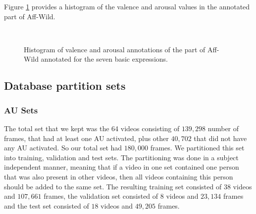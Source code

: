 \documentclass[a4paper, 10pt, conference]{ieeeconf}      %
\begin{document}
Figure \ref{hist_va_bas_expr} provides a histogram of the valence and arousal
values in the annotated part of Aff-Wild.

\begin{figure}[h]
\centering
{}\\
\caption{Histogram of valence and arousal annotations of the part of Aff-Wild annotated for the seven basic expressions.}
\label{hist_va_bas_expr}
\vskip -0.3cm
\end{figure}


\begin{comment}
\begin{figure}[h]
\scalebox{1}{
\begin{tabular}{cc}
  \texttt{[image: happy.png]} &   \texttt{[image: surprise.png]} \\
 \texttt{[image: disgust.png]} &   \texttt{[image: fear.png]} \\
   \texttt{[image: sadness.png]} &   \texttt{[image: angry.png]} \\
\end{tabular}
}
\caption{Distributions of six basic expressions in the VA-Space}
\label{fig:basi_expr_dist_va}
\vskip -0.5cm
\end{figure}
\end{comment}


\subsection{Database partition sets}\label{sets}


\subsubsection{AU Sets}\label{sets}

The total set that we kept was the 64 videos consisting of $139,298$ number of frames, that had at least one AU activated, plus other $40,702$ that did not have any AU activated. So our total set had $180,000$ frames. We partitioned this set into training, validation and test sets. The partitioning was done in a subject independent manner, meaning that if a video in one set contained one person that was also present in other videos, then all videos containing this person should be added to the same set. 
The resulting training set consisted of $38$ videos and $107,661$ frames, the validation set consisted of $8$ videos and $23,134$ frames and the test set consisted of $18$ videos and $49,205$ frames.
\end{document}
